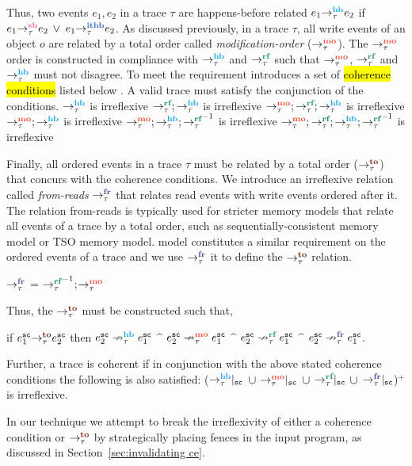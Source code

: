 Thus, two events $e_1,e_2$ in a trace $\tau$ are happens-before 
related \ie
$\hb{\tau}{e_1}{e_2}$ if $\seqb{\tau}{e_1}{e_2}$ $\vee$ 
$\ithb{\tau}{e_1}{e_2}$.
%
As discussed previously, in a trace $\tau$, all write events of 
an object $o$ are related by a total order called 
{\em modification-order} ($\setMO$).
%
The $\setMO$ order is constructed in compliance with $\setHB$ and 
$\setRF$ such that $\setMO$, $\setRF$ and $\setHB$ must not 
disagree.
%
To meet the requirement \cc introduces a set of
\hl{coherence conditions} listed below \cite{LahavVafeiadis-PLDI17}.
A valid \cc trace must satisfy the conjunction
of the conditions.
%
\newline $\setHB$ is irreflexive
\newline $\setRF;\setHB$ is irreflexive
\newline $\setMO;\setRF;\setHB$ is irreflexive
\newline $\setMO;\setHB$ is irreflexive
\newline $\setMO;\setHB;\setRF^{-1}$ is irreflexive
\newline $\setMO;\setRF;\setHB;\setRF^{-1}$ is irreflexive

Finally, all \sc ordered events in a trace $\tau$ must be related
by a total order ($\setTO$) that concurs with the coherence conditions.
%
We introduce an irreflexive relation called {\em from-reads} $\setFR$ 
that relates read events with write events ordered after it.
%
The relation from-reads is typically used for stricter memory models 
that relate all events of a trace by a total order,
such as sequentially-consistent memory model or TSO memory model.
\cc model constitutes a similar requirement on the \sc ordered
events of a trace and we use $\setFR$ it to define the $\setTO$
relation.
%
\begin{definition}
	$\setFR$ = $\setRF^{-1}$;$\setMO$
\end{definition}
%
Thus, the $\setTO$ must be constructed such that,

if 
$\to{\tau}{e^\sc_1}{e^\sc_2}$ then 
$\nhb{\tau}{e^\sc_2}{e^\sc_1}$ $\^$
$\nmo{\tau}{e^\sc_2}{e^\sc_1}$ $\^$
$\nrf{\tau}{e^\sc_2}{e^\sc_1}$ $\^$
$\nfr{\tau}{e^\sc_2}{e^\sc_1}$.

\noindent
Further, a trace is coherent if in conjunction with the
above stated coherence conditions the following is also satisfied: 
($\onsc{\setHB}$ $\cup$ $\onsc{\setMO}$ $\cup$ 
$\onsc{\setRF}$ $\cup$ $\onsc{\setFR}$)$^+$
is irreflexive.

In our technique we attempt to break the irreflexivity of either
a coherence condition or $\setTO$ by strategically placing \cc fences 
in the input program, as discussed in Section~\ref{sec:invalidating ce}.


